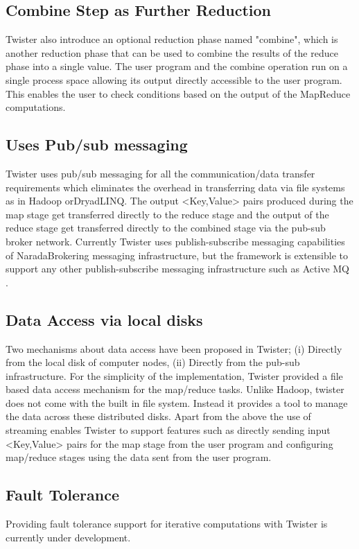 \documentclass[9pt,twocolumn,twoside]{../../styles/osajnl}
\begin{document}
\subsection{Combine Step as Further Reduction}
Twister also introduce an optional reduction phase named "combine",
which is another reduction phase that can be used to combine the
results of the reduce phase into a single value. The user program and
the combine operation run on a single process space allowing its
output directly accessible to the user
program\cite{grolinger2014challenges}. This enables the user to check
conditions based on the output of the MapReduce
computations\cite{twister}.

\subsection{Uses Pub/sub messaging}
Twister uses pub/sub messaging for all the communication/data transfer
requirements which eliminates the overhead in transferring data via
file systems as in Hadoop orDryadLINQ\cite{grolinger2014challenges}. The output <Key,Value> pairs
produced during the map stage get transferred directly to the reduce
stage and the output of the reduce stage get transferred directly to
the combined stage via the pub-sub broker
network\cite{lee2012parallel}. Currently Twister uses
publish-subscribe messaging capabilities of NaradaBrokering messaging
infrastructure, but the framework is extensible to support any other
publish-subscribe messaging infrastructure such as Active MQ
\cite{twister}.

\subsection{Data Access via local disks}
Two mechanisms about data access have been proposed in Twister; (i)
Directly from the local disk of computer nodes, (ii) Directly from the
pub-sub infrastructure\cite{elsayed2014mapreduce}. For the simplicity
of the implementation, Twister provided a file based data access
mechanism for the map/reduce tasks. Unlike Hadoop, twister does not
come with the built in file system. Instead it provides a tool to
manage the data across these distributed disks.  Apart from the above
the use of streaming enables Twister to support features such as
directly sending input <Key,Value> pairs for the map stage from the
user program and configuring map/reduce stages using the data sent
from the user program\cite{mohammed2014applications}.

\subsection{Fault Tolerance}
Providing fault tolerance support for iterative computations with
Twister is currently under development.
\end{document}
